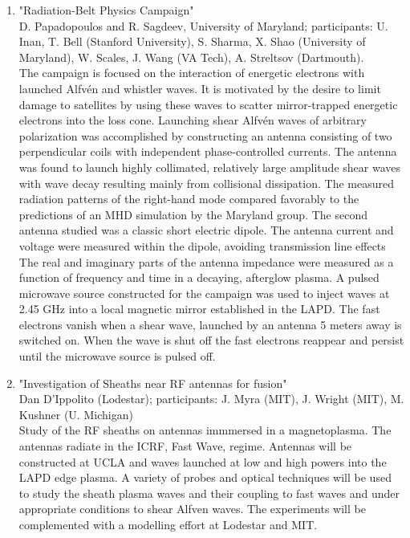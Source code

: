 \documentclass[11pt]{article}
\begin{document}
\begin{enumerate}
 
\item "Radiation-Belt Physics Campaign"\\
D. Papadopoulos and R. Sagdeev, University of Maryland; participants: U. Inan, T. Bell (Stanford University), S. Sharma, X. Shao (University of Maryland), W. Scales, J. Wang (VA Tech), A. Streltsov (Dartmouth).\\
The campaign is focused on the interaction of energetic electrons with launched Alfv\'{e}n and whistler waves. It is motivated by the desire to limit damage to satellites by using these waves to scatter mirror-trapped energetic electrons into the loss cone. Launching shear Alfv\'{e}n waves of arbitrary polarization was accomplished by constructing an antenna consisting of two perpendicular coils with independent phase-controlled currents. The antenna was found to launch highly collimated, relatively large amplitude shear waves with wave decay resulting mainly from collisional dissipation. The measured radiation patterns of the right-hand mode compared favorably to the predictions of an MHD simulation by the Maryland group. The second antenna studied was a classic short electric dipole. The antenna current and voltage were measured within the dipole, avoiding transmission line effects The real and imaginary parts of the antenna impedance were measured as a function of frequency and time in a decaying, afterglow plasma. A pulsed microwave source constructed for the campaign was used to inject waves at 2.45 GHz into a local magnetic mirror established in the LAPD. The fast electrons vanish when a shear wave, launched by an antenna 5 meters away is switched on. When the wave is shut off the fast electrons reappear and persist until the microwave source is pulsed off.

\item "Investigation of Sheaths near RF antennas for fusion"\\
Dan D'Ippolito (Lodestar); participants: J. Myra (MIT), J. Wright (MIT), M. Kushner (U. Michigan)\\
Study of the RF sheaths on antennas immmersed in a magnetoplasma. The antennas radiate in the ICRF, Fast Wave, regime. Antennas will be constructed at UCLA and waves launched at low and high powers into the LAPD edge plasma. A variety of probes and optical techniques will be used to study the sheath plasma waves and their coupling to fast waves and under appropriate conditions to shear Alfven waves. The experiments will be complemented with a modelling effort at Lodestar and MIT.\\

\end{enumerate}





%
%
%
%  
\end{document}
